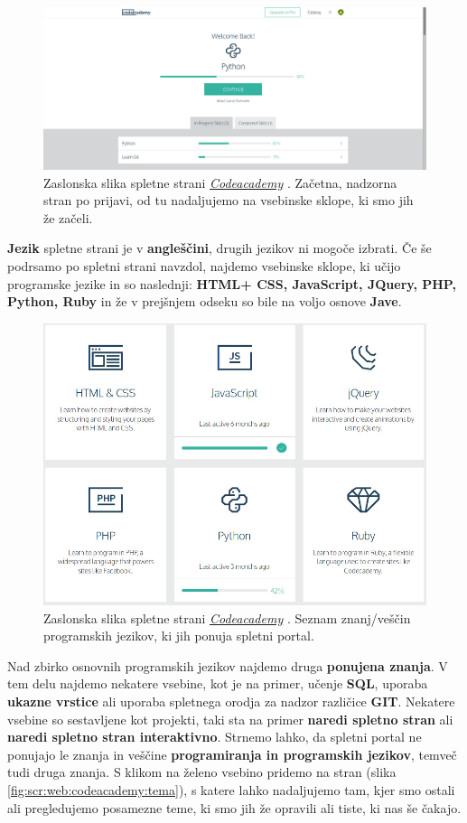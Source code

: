 \begin{figure}[h!]
  \centering
    \includegraphics [width=0.65\linewidth, keepaspectratio =
    1] {./images/sc_web/codeacademy_login_01.jpg}
    \caption{Zaslonska slika spletne strani
      \emph{\href{https://www.codecademy.com/}{Codeacademy}}
      \cite{web:codeacademy}. Začetna, nadzorna stran po prijavi, od
      tu nadaljujemo na vsebinske sklope, ki smo jih že začeli.}
    \label{fig:scr:web:codeacademy}
\end{figure}

\textbf{Jezik} spletne strani je v \textbf{angleščini}, drugih jezikov ni
mogoče izbrati. Če še podrsamo po spletni strani navzdol, najdemo
vsebinske sklope, ki učijo programske jezike in so naslednji: \textbf{HTML+
  CSS, JavaScript, JQuery, PHP, Python, Ruby} in že v prejšnjem odseku
so bile na voljo osnove \textbf{Jave}.

\begin{figure}[h!]
  \centering
    \includegraphics [width=0.65\linewidth, keepaspectratio =
    1] {./images/sc_web/codeacademy_vescine_02.jpg}
    \caption{Zaslonska slika spletne strani
      \emph{\href{https://www.codecademy.com/}{Codeacademy}}
      \cite{web:codeacademy}. Seznam znanj/veščin programskih jezikov,
      ki jih ponuja spletni portal.}
    \label{fig:scr:web:codeacademy:vescine-prog}
\end{figure}

Nad zbirko osnovnih programskih jezikov najdemo druga
\textbf{ponujena znanja}. V tem delu najdemo nekatere vsebine, kot je
na primer, učenje \textbf{SQL}, uporaba \textbf{ukazne vrstice} ali
uporaba spletnega orodja za nadzor različice \textbf{GIT}. Nekatere
vsebine so sestavljene kot projekti, taki sta na primer \textbf{naredi
  spletno stran} ali \textbf{naredi spletno stran interaktivno}. 
Strnemo lahko, da spletni portal ne ponujajo le znanja in veščine
\textbf{programiranja in programskih jezikov}, temveč tudi druga
znanja. S klikom na želeno vsebino pridemo na stran (slika
\ref{fig:scr:web:codeacademy:tema}), s katere lahko nadaljujemo tam,
kjer smo ostali ali pregledujemo posamezne teme, ki smo jih že
opravili ali tiste, ki nas še čakajo.


